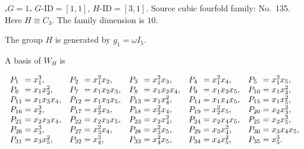 \documentclass[12pt]{amsart}
\makeatletter
\numberwithin{equation}{section}
\theoremstyle{plain}
\theoremstyle{definition}
\theoremstyle{remark}
\newcommand{\PBasisLabel}[1]{\mathrlap{P_{#1}}\phantom{P_{99}}}
\newenvironment{SecEightAlignedBasis}[1]{%
  \begingroup\renewcommand{\arraystretch}{1.18}%
  \[\begin{array}{@{}#1@{}}%
}{\end{array}\]\endgroup}
\newenvironment{familydisplay}{%
  \begingroup
  \setlength{\arraycolsep}{1.35pt}%
  \renewcommand{\arraystretch}{0.96}%
  \setlength{\jot}{2pt}%
}{\endgroup}
\makeatother
\begin{document}
\par{}\medskip\noindent\textbf{.\enspace $G=1$.}\label{fam:threefold-no-34}
$G\text{-ID}=[1,1]$, $H\text{-ID}=[3,1]$.
Source cubic fourfold family: No.~135.  Here
$H\cong C_3$.
The family dimension is $10$.
\par\smallskip\noindent The group $H$ is generated by $g_1=\omega I_5$.
\par\smallskip\noindent A basis of $W_H$ is\par\nopagebreak
\begin{familydisplay}
\begin{SecEightAlignedBasis}{l@{\quad}l@{\quad}l@{\quad}l@{\quad}l}
\PBasisLabel{1}=x_{1}^{3}, & \PBasisLabel{2}=x_{1}^{2}x_{2}, & \PBasisLabel{3}=x_{1}^{2}x_{3}, & \PBasisLabel{4}=x_{1}^{2}x_{4}, & \PBasisLabel{5}=x_{1}^{2}x_{5},\\
\PBasisLabel{6}=x_{1}x_{2}^{2}, & \PBasisLabel{7}=x_{1}x_{2}x_{3}, & \PBasisLabel{8}=x_{1}x_{2}x_{4}, & \PBasisLabel{9}=x_{1}x_{2}x_{5}, & \PBasisLabel{10}=x_{1}x_{3}^{2},\\
\PBasisLabel{11}=x_{1}x_{3}x_{4}, & \PBasisLabel{12}=x_{1}x_{3}x_{5}, & \PBasisLabel{13}=x_{1}x_{4}^{2}, & \PBasisLabel{14}=x_{1}x_{4}x_{5}, & \PBasisLabel{15}=x_{1}x_{5}^{2},\\
\PBasisLabel{16}=x_{2}^{3}, & \PBasisLabel{17}=x_{2}^{2}x_{3}, & \PBasisLabel{18}=x_{2}^{2}x_{4}, & \PBasisLabel{19}=x_{2}^{2}x_{5}, & \PBasisLabel{20}=x_{2}x_{3}^{2},\\
\PBasisLabel{21}=x_{2}x_{3}x_{4}, & \PBasisLabel{22}=x_{2}x_{3}x_{5}, & \PBasisLabel{23}=x_{2}x_{4}^{2}, & \PBasisLabel{24}=x_{2}x_{4}x_{5}, & \PBasisLabel{25}=x_{2}x_{5}^{2},\\
\PBasisLabel{26}=x_{3}^{3}, & \PBasisLabel{27}=x_{3}^{2}x_{4}, & \PBasisLabel{28}=x_{3}^{2}x_{5}, & \PBasisLabel{29}=x_{3}x_{4}^{2}, & \PBasisLabel{30}=x_{3}x_{4}x_{5},\\
\PBasisLabel{31}=x_{3}x_{5}^{2}, & \PBasisLabel{32}=x_{4}^{3}, & \PBasisLabel{33}=x_{4}^{2}x_{5}, & \PBasisLabel{34}=x_{4}x_{5}^{2}, & \PBasisLabel{35}=x_{5}^{3}.
\end{SecEightAlignedBasis}
\end{familydisplay}
\end{document}

